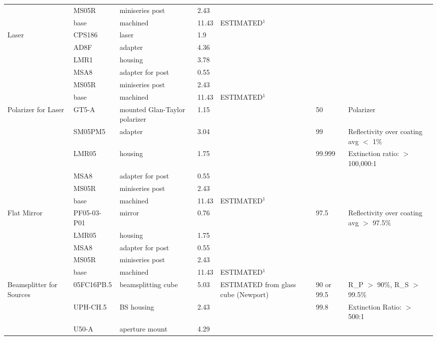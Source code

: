 \documentclass[12pt]{article}
\begin{document}
\begin{landscape}
\begin{center}
\begin{longtable}{| p{3.25cm} | p{2.2cm} | p{3cm} | p{1.75cm} | p{2.5cm} | p{1.55cm} | p{5cm} |}
          & MS05R & miniseries post & 2.43  &       &       &  \\
          & base  & machined & 11.43 & ESTIMATED$^1$ &       &  \\ \hline
    \multirow{5}{*}{Laser} & CPS186 & laser & 1.9   &       &       &  \\ 
          & AD8F  & adapter & 4.36  &       &       &  \\
          & LMR1  & housing & 3.78  &       &       &  \\
          & MSA8  & adapter for post & 0.55  &       &       &  \\
          & MS05R & miniseries post & 2.43  &       &       &  \\
          & base  & machined & 11.43 & ESTIMATED$^1$  &       &  \\ \hline
    \multirow{6}{*}{\parbox{3.25cm}{Polarizer for Laser}} & GT5-A & mounted Glan-Taylor polarizer & 1.15  &       & 50    & Polarizer \\ 
          & SM05PM5 & adapter & 3.04  &       & 99    & Reflectivity over coating avg $<$ 1\% \\
          & LMR05 & housing & 1.75  &       & 99.999 & Extinction ratio: $>$ 100,000:1 \\
          & MSA8  & adapter for post & 0.55  &       &       &  \\
          & MS05R & miniseries post & 2.43  &       &       &  \\
          & base  & machined & 11.43 & ESTIMATED$^1$ &       &  \\ \hline
    \multirow{5}{*}{Flat Mirror} & PF05-03-P01 & mirror & 0.76  &       & 97.5  & Reflectivity over coating avg $>$ 97.5\% \\ 
          & LMR05 & housing & 1.75  &       &       &  \\
          & MSA8  & adapter for post & 0.55  &       &       &  \\
          & MS05R & miniseries post & 2.43  &       &       &  \\
          & base  & machined & 11.43 & ESTIMATED$^1$ &       &  \\ \hline
    \multirow{6}{*}{\parbox{3.25cm}{Beamsplitter for Sources}} & 05FC16PB.5 & beamsplitting cube & 5.03  & ESTIMATED from glass cube (Newport) & 90 or 99.5 & R\_P $>$ 90\%, R\_S $>$ 99.5\% \\ 
          & UPH-CH.5 & BS housing & 2.43  &       & 99.8  & Extinction Ratio: $>$ 500:1 \\
          & U50-A & aperture mount & 4.29  &       &       &  \\

\end{longtable}
\end{center}
\end{landscape}
\end{document}

